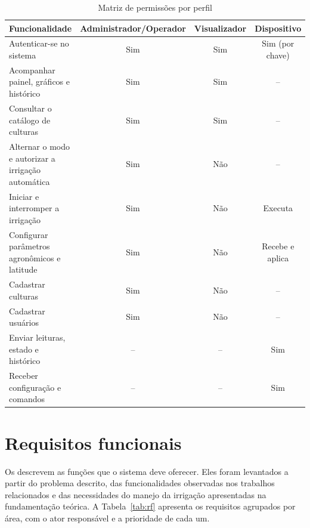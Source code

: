 \begin{table}[htbp]
  \centering
  \caption{Matriz de permissões por perfil}
  \label{tab:permissoes}
  \small
  \renewcommand{\arraystretch}{1.2}
  \begin{tabularx}{\textwidth}{>{\raggedright\arraybackslash}X ccc}
    \hline
    \textbf{Funcionalidade} & \textbf{Administrador/Operador} & \textbf{Visualizador} &
    \textbf{Dispositivo} \\
    \hline
    Autenticar-se no sistema & Sim & Sim & Sim (por chave) \\
    Acompanhar painel, gráficos e histórico & Sim & Sim & -- \\
    Consultar o catálogo de culturas & Sim & Sim & -- \\
    Alternar o modo e autorizar a irrigação automática & Sim & Não & -- \\
    Iniciar e interromper a irrigação & Sim & Não & Executa \\
    Configurar parâmetros agronômicos e latitude & Sim & Não & Recebe e aplica \\
    Cadastrar culturas & Sim & Não & -- \\
    Cadastrar usuários & Sim & Não & -- \\
    Enviar leituras, estado e histórico & -- & -- & Sim \\
    Receber configuração e comandos & -- & -- & Sim \\
    \hline
  \end{tabularx}
\end{table}

\section{Requisitos funcionais}
\label{sec:rf}

Os  descrevem as funções que o sistema deve oferecer. Eles foram levantados a partir do problema descrito, das funcionalidades observadas nos trabalhos relacionados e das necessidades do manejo da irrigação apresentadas na fundamentação teórica. A Tabela~\ref{tab:rf} apresenta os requisitos agrupados por área, com o ator responsável e a prioridade de cada um.

